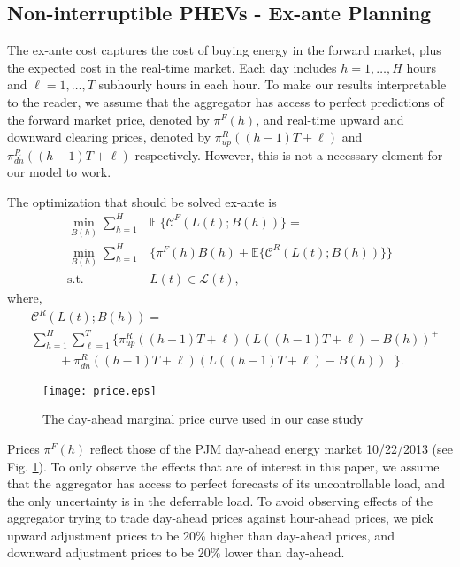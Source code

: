 \documentclass[10pt]{IEEEtran}
\begin{document}
\subsection{Non-interruptible PHEVs - Ex-ante Planning}\label{sec.PHEVex-ante}
The ex-ante cost captures the cost of buying energy in the forward market, plus the expected cost in the real-time market. Each day includes $h = 1,\ldots, H$ hours and $\ell = 1,\ldots,T$ subhourly hours in each hour. To make our results interpretable to the reader, we assume that the aggregator has access to perfect predictions of the forward market price, denoted by $\pi^{F}(h)$, and real-time upward and downward clearing prices, denoted by $\pi^{R}_{up}((h-1)T+\ell)$ and $\pi^{R}_{dn}((h-1)T+\ell)$ respectively. However, this is not a necessary element for our model to work.

The optimization that should be solved ex-ante is
\begin{align}
\min_{B(h)} \sum_{h=1}^H & {\mathbb E} ~\{ {\mathcal C}^{F}(L(t);B(h))\} = \label{dacost}\\ 
\min_{B(h)} \sum_{h=1}^H &\bigg\{ \pi^{F}(h) B(h) +  {\mathbb E}\{ {\mathcal C}^{R}(L(t);B(h)) \}  \bigg\}\nonumber\\
\mbox{s.t.}~~~~~& L(t)\in { \mathcal L}(t),\nonumber
\end{align}
where,
\begin{align}\label{rtcost}
&{\mathcal C}^{R}(L(t);B(h)) =\\ &\sum_{h=1}^{H} \sum_{\ell = 1}^T \big\{ \pi^{R}_{up}((h-1)T+\ell) (L((h-1)T+\ell) - B(h))^+ \nonumber\\ &~~~~~~~~~~+\pi^{R}_{dn}((h-1)T+\ell) (L((h-1)T+\ell) - B(h))^- \big\}. \nonumber\end{align}


\begin{figure}
{\texttt{[image: price.eps]}}
\caption{The day-ahead marginal price curve used in our case study }
\label{fig:price}
\end{figure}


Prices $\pi^{F}(h)$ reflect those of the PJM day-ahead energy market 10/22/2013				
 (see Fig. \ref{fig:price}). To only observe the effects that are of interest in this paper, we assume that the aggregator has access to perfect forecasts of  its uncontrollable load, and the only uncertainty is in the deferrable load. To avoid observing  effects of the aggregator trying to trade day-ahead prices against hour-ahead prices, we pick upward adjustment prices  to be 20$\%$ higher than day-ahead prices, and  downward adjustment prices to be 20$\%$ lower than day-ahead.
\end{document}
